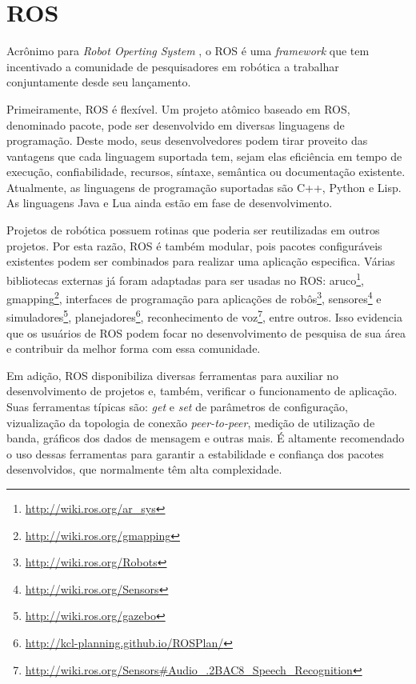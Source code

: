\chapter[ROS]{ROS} \label{cap:ros}
    
    Acrônimo para \textit{Robot Operting System} \cite{ref:quigley2009ros}, o ROS é uma \textit{framework} que tem incentivado a comunidade de pesquisadores em robótica a trabalhar conjuntamente desde seu lançamento.
    
    Primeiramente, ROS é flexível. Um projeto atômico baseado em ROS, denominado pacote, pode ser desenvolvido em diversas linguagens de programação. Deste modo, seus desenvolvedores podem tirar proveito das vantagens que cada linguagem suportada tem, sejam elas eficiência em tempo de execução, confiabilidade, recursos, síntaxe, semântica ou documentação existente. Atualmente, as linguagens de programação suportadas são C++, Python e Lisp. As linguagens Java e Lua ainda estão em fase de desenvolvimento.
    
    Projetos de robótica possuem rotinas que poderia ser reutilizadas em outros projetos. Por esta razão, ROS é também modular, pois pacotes configuráveis existentes podem ser combinados para realizar uma aplicação especifica. Várias bibliotecas externas já foram adaptadas para ser usadas no ROS: aruco\footnote{\url{http://wiki.ros.org/ar_sys}}, gmapping\footnote{\url{http://wiki.ros.org/gmapping}}, interfaces de programação para aplicações de robôs\footnote{\url{http://wiki.ros.org/Robots}}, sensores\footnote{\url{http://wiki.ros.org/Sensors}} e simuladores\footnote{\url{http://wiki.ros.org/gazebo}}, planejadores\footnote{\url{http://kcl-planning.github.io/ROSPlan/}}, reconhecimento de voz\footnote{\url{http://wiki.ros.org/Sensors\#Audio_.2BAC8_Speech_Recognition}}, entre outros. Isso evidencia que os usuários de ROS podem focar no desenvolvimento de pesquisa de sua área e contribuir da melhor forma com essa comunidade.
    
    Em adição, ROS disponibiliza diversas ferramentas para auxiliar no desenvolvimento de projetos e, também, verificar o funcionamento de aplicação. Suas ferramentas típicas são: \textit{get} e \textit{set} de parâmetros de configuração, vizualização da topologia de conexão \textit{peer-to-peer}, medição de utilização de banda, gráficos dos dados de mensagem e outras mais. É altamente recomendado o uso dessas ferramentas para garantir a estabilidade e confiança dos pacotes desenvolvidos, que normalmente têm alta complexidade.
    
